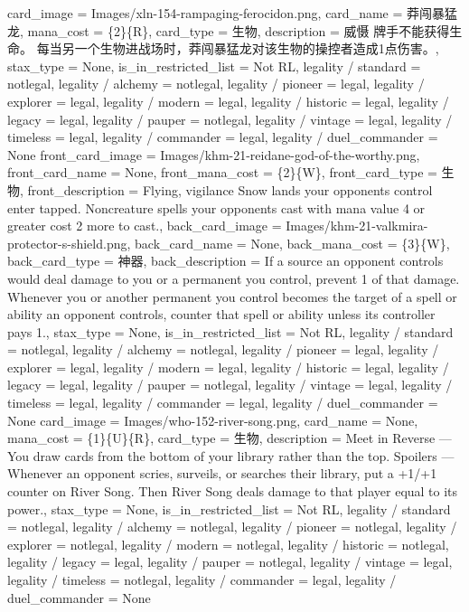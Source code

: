 \documentclass[lang = cn, color = black, 10pt]{AllThatStax}
\begin{document}
\card
{
	card_image = Images/xln-154-rampaging-ferocidon.png,
	card_name = 莽闯暴猛龙,
	mana_cost = \{2\}\{R\},
	card_type = 生物,
	description = 威慑
	牌手不能获得生命。
	每当另一个生物进战场时，莽闯暴猛龙对该生物的操控者造成1点伤害。,
	stax_type = None,
	is_in_restricted_list = Not RL,
	legality / standard = notlegal,
	legality / alchemy = notlegal,
	legality / pioneer = legal,
	legality / explorer = legal,
	legality / modern = legal,
	legality / historic = legal,
	legality / legacy = legal,
	legality / pauper = notlegal,
	legality / vintage = legal,
	legality / timeless = legal,
	legality / commander = legal,
	legality / duel_commander = None
}
\mfcard
{
	front_card_image = Images/khm-21-reidane-god-of-the-worthy.png,
	front_card_name = None,
	front_mana_cost = \{2\}\{W\},
	front_card_type = 生物,
	front_description = Flying, vigilance
	Snow lands your opponents control enter tapped.
	Noncreature spells your opponents cast with mana value 4 or greater cost {2} more to cast.,
	back_card_image = Images/khm-21-valkmira-protector-s-shield.png,
	back_card_name = None,
	back_mana_cost = \{3\}\{W\},
	back_card_type = 神器,
	back_description = If a source an opponent controls would deal damage to you or a permanent you control, prevent 1 of that damage.
	Whenever you or another permanent you control becomes the target of a spell or ability an opponent controls, counter that spell or ability unless its controller pays {1}.,
	stax_type = None,
	is_in_restricted_list = Not RL,
	legality / standard = notlegal,
	legality / alchemy = notlegal,
	legality / pioneer = legal,
	legality / explorer = legal,
	legality / modern = legal,
	legality / historic = legal,
	legality / legacy = legal,
	legality / pauper = notlegal,
	legality / vintage = legal,
	legality / timeless = legal,
	legality / commander = legal,
	legality / duel_commander = None
}
\card
{
	card_image = Images/who-152-river-song.png,
	card_name = None,
	mana_cost = \{1\}\{U\}\{R\},
	card_type = 生物,
	description = Meet in Reverse — You draw cards from the bottom of your library rather than the top.
	Spoilers — Whenever an opponent scries, surveils, or searches their library, put a +1/+1 counter on River Song. Then River Song deals damage to that player equal to its power.,
	stax_type = None,
	is_in_restricted_list = Not RL,
	legality / standard = notlegal,
	legality / alchemy = notlegal,
	legality / pioneer = notlegal,
	legality / explorer = notlegal,
	legality / modern = notlegal,
	legality / historic = notlegal,
	legality / legacy = legal,
	legality / pauper = notlegal,
	legality / vintage = legal,
	legality / timeless = notlegal,
	legality / commander = legal,
	legality / duel_commander = None
}
\end{document}
